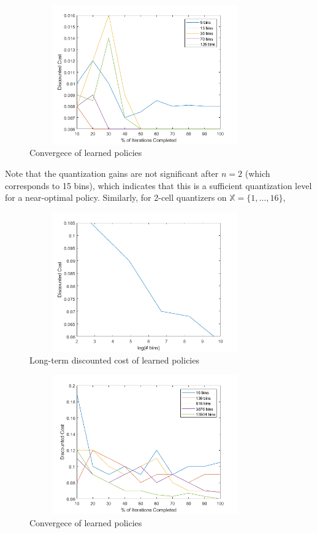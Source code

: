\documentclass{article}
\begin{document}
\begin{figure}[H]
    \centering
    \includegraphics[height=6cm, width=10cm]{convergence_5.png}
    \caption{Convergece of learned policies}
\end{figure}

Note that the quantization gains are not significant after \( n=2 \) (which corresponds to 15 bins), which indicates that this is a sufficient quantization level for a near-optimal policy.
\newpage
Similarly, for 2-cell quantizers on \( \mathbb{X} = \{1,\ldots,16\} \),

\begin{figure}[H]
    \centering
    \includegraphics[height=6cm, width=10cm]{cost_16.png}
    \caption{Long-term discounted cost of learned policies}
\end{figure}

\begin{figure}[H]
    \centering
    \includegraphics[height=6cm, width=10cm]{convergence_16.png}
    \caption{Convergece of learned policies}
\end{figure}
\end{document}
